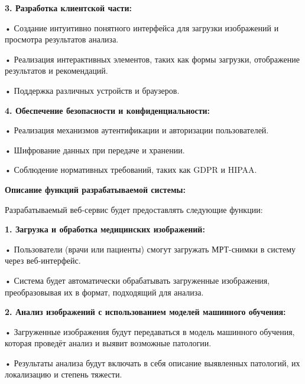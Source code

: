 {  \par \redline \textbf{3. Разработка клиентской части:}
  \par \redline \hspace{0.3cm} • Создание интуитивно понятного интерфейса для загрузки изображений и просмотра результатов анализа.
  \par \redline \hspace{0.3cm} • Реализация интерактивных элементов, таких как формы загрузки, отображение результатов и рекомендаций.
  \par \redline \hspace{0.3cm} • Поддержка различных устройств и браузеров.

  \par \redline \textbf{4. Обеспечение безопасности и конфиденциальности:}
  \par \redline \hspace{0.3cm} • Реализация механизмов аутентификации и авторизации пользователей.
  \par \redline \hspace{0.3cm} • Шифрование данных при передаче и хранении.
  \par \redline \hspace{0.3cm} • Соблюдение нормативных требований, таких как GDPR и HIPAA.

  \par \redline \textbf{Описание функций разрабатываемой системы:}
  \par \redline Разрабатываемый веб-сервис будет предоставлять следующие функции:

  \par \redline \textbf{1. Загрузка и обработка медицинских изображений:}
  \par \redline \hspace{0.3cm} • Пользователи (врачи или пациенты) смогут загружать МРТ-снимки в систему через веб-интерфейс.
  \par \redline \hspace{0.3cm} • Система будет автоматически обрабатывать загруженные изображения, преобразовывая их в формат, подходящий для анализа.

  \par \redline \textbf{2. Анализ изображений с использованием моделей машинного обучения:}
  \par \redline \hspace{0.3cm} • Загруженные изображения будут передаваться в модель машинного обучения, которая проведёт анализ и выявит возможные патологии.
  \par \redline \hspace{0.3cm} • Результаты анализа будут включать в себя описание выявленных патологий, их локализацию и степень тяжести.

}
